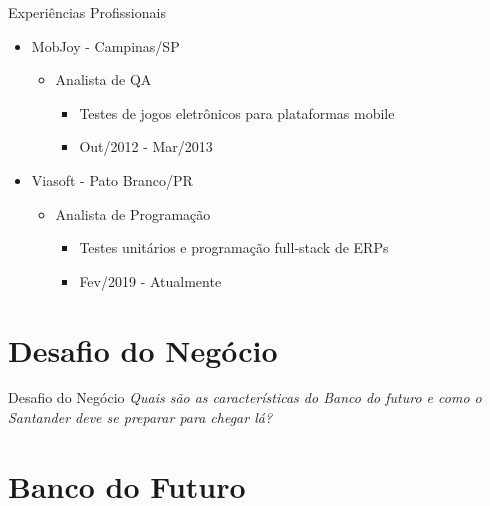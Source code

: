 \documentclass{beamer}
\begin{document}
\begin{frame}{Experiências Profissionais}
 
 \begin{itemize}
  \item MobJoy - Campinas/SP
      \begin{itemize}
	  \item[] Analista de QA
	  \begin{itemize}
	      \item[]Testes de jogos eletrônicos para plataformas mobile

		  \item[] Out/2012 - Mar/2013\newline

	  \end{itemize}
      \end{itemize}
  \item Viasoft - Pato Branco/PR
      \begin{itemize}
	  \item[] Analista de Programação
	  \begin{itemize}
	      \item[]Testes unitários e programação full-stack de ERPs

		  \item[] Fev/2019 - Atualmente
	  \end{itemize}
      \end{itemize}

 \end{itemize}

 
\end{frame}

\section{Desafio do Negócio}
\begin{frame}{Desafio do Negócio}
 \center \textit{Quais são as características do Banco do futuro e como o Santander deve se preparar para chegar lá?}
\end{frame}

\section{Banco do Futuro}
\end{document}
